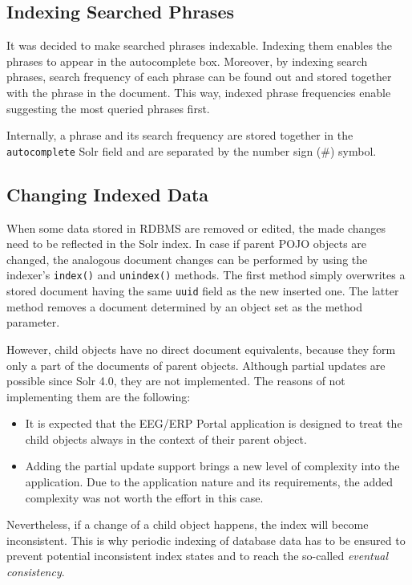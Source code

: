 \subsection{Indexing Searched Phrases}

It was decided to make searched phrases indexable.
Indexing them enables the phrases to appear in the autocomplete box.
Moreover, by indexing search phrases, search frequency of each phrase can be found out and stored together with the phrase in the document.
This way, indexed phrase frequencies enable suggesting the most queried phrases first.

Internally, a phrase and its search frequency are stored together in the \texttt{autocomplete} Solr field and are separated by the number sign (\#) symbol.

\subsection{Changing Indexed Data}

When some data stored in RDBMS are removed or edited, the made changes need to be reflected in the Solr index.
In case if parent POJO objects are changed, the analogous document changes can be performed by using the indexer's \texttt{index()} and \texttt{unindex()} methods. The first method simply overwrites a stored document having the same \texttt{uuid} field as the new inserted one. The latter method removes a document determined by an object set as the method parameter.

However, child objects have no direct document equivalents, because they form only a part of the documents of parent objects.
Although partial updates are possible since Solr 4.0, they are not implemented.
The reasons of not implementing them are the following:
	
	\begin{itemize}
		\item It is expected that the EEG/ERP Portal application is designed to treat the child objects always in the context of their parent object.
		\item Adding the partial update support brings a new level of complexity into the application. Due to the application nature and its requirements, the added complexity was not worth the effort in this case.
	\end{itemize}

Nevertheless, if a change of a child object happens, the index will become inconsistent.	
This is why periodic indexing of database data has to be ensured to prevent potential inconsistent index states and to reach the so-called \textit{eventual consistency}.

